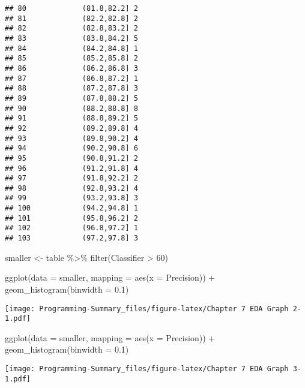\documentclass[
]{article}
\newenvironment{Shaded}{\begin{snugshade}}{\end{snugshade}}
\newcommand{\AttributeTok}[1]{\textcolor[rgb]{0.77,0.63,0.00}{#1}}
\newcommand{\DecValTok}[1]{\textcolor[rgb]{0.00,0.00,0.81}{#1}}
\newcommand{\FloatTok}[1]{\textcolor[rgb]{0.00,0.00,0.81}{#1}}
\newcommand{\FunctionTok}[1]{\textcolor[rgb]{0.00,0.00,0.00}{#1}}
\newcommand{\NormalTok}[1]{#1}
\newcommand{\OtherTok}[1]{\textcolor[rgb]{0.56,0.35,0.01}{#1}}
\newcommand{\SpecialCharTok}[1]{\textcolor[rgb]{0.00,0.00,0.00}{#1}}
\begin{document}
\begin{verbatim}
## 80             (81.8,82.2] 2
## 81             (82.2,82.8] 2
## 82             (82.8,83.2] 2
## 83             (83.8,84.2] 5
## 84             (84.2,84.8] 1
## 85             (85.2,85.8] 2
## 86             (86.2,86.8] 3
## 87             (86.8,87.2] 1
## 88             (87.2,87.8] 3
## 89             (87.8,88.2] 5
## 90             (88.2,88.8] 8
## 91             (88.8,89.2] 5
## 92             (89.2,89.8] 4
## 93             (89.8,90.2] 4
## 94             (90.2,90.8] 6
## 95             (90.8,91.2] 2
## 96             (91.2,91.8] 4
## 97             (91.8,92.2] 2
## 98             (92.8,93.2] 4
## 99             (93.2,93.8] 3
## 100            (94.2,94.8] 1
## 101            (95.8,96.2] 2
## 102            (96.8,97.2] 1
## 103            (97.2,97.8] 3
\end{verbatim}

\begin{Shaded}
\begin{Highlighting}[]
\NormalTok{smaller }\OtherTok{\textless{}{-}}\NormalTok{ table }\SpecialCharTok{\%\textgreater{}\%}
  \FunctionTok{filter}\NormalTok{(Classifier }\SpecialCharTok{\textgreater{}} \DecValTok{60}\NormalTok{)}
\end{Highlighting}
\end{Shaded}

\begin{Shaded}
\begin{Highlighting}[]
\FunctionTok{ggplot}\NormalTok{(}\AttributeTok{data =}\NormalTok{ smaller, }\AttributeTok{mapping =} \FunctionTok{aes}\NormalTok{(}\AttributeTok{x =}\NormalTok{ Precision)) }\SpecialCharTok{+}
  \FunctionTok{geom\_histogram}\NormalTok{(}\AttributeTok{binwidth =} \FloatTok{0.1}\NormalTok{)}
\end{Highlighting}
\end{Shaded}

\texttt{[image: Programming-Summary\_files/figure-latex/Chapter 7 EDA Graph 2-1.pdf]}

\begin{Shaded}
\begin{Highlighting}[]
\FunctionTok{ggplot}\NormalTok{(}\AttributeTok{data =}\NormalTok{ smaller, }\AttributeTok{mapping =} \FunctionTok{aes}\NormalTok{(}\AttributeTok{x =}\NormalTok{ Precision)) }\SpecialCharTok{+}
  \FunctionTok{geom\_histogram}\NormalTok{(}\AttributeTok{binwidth =} \FloatTok{0.1}\NormalTok{)}
\end{Highlighting}
\end{Shaded}

\texttt{[image: Programming-Summary\_files/figure-latex/Chapter 7 EDA Graph 3-1.pdf]}
\end{document}
